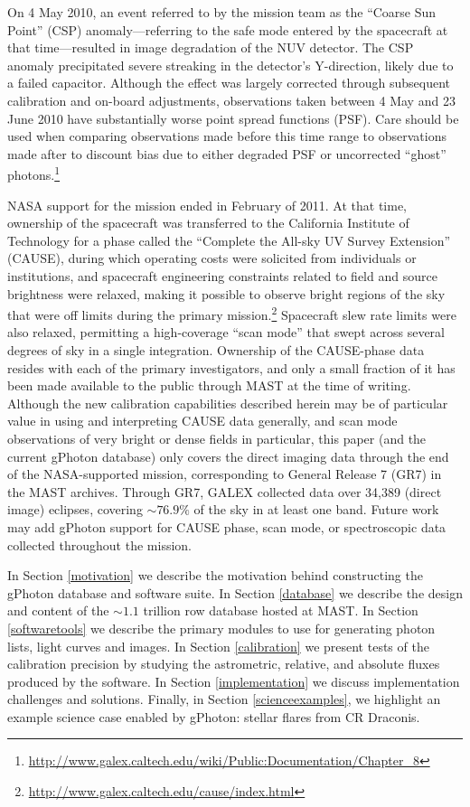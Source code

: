 \documentclass[preprint]{aastex}
\begin{document}
On 4 May 2010, an event referred to by the mission team as the ``Coarse Sun Point'' (CSP) anomaly---referring to the safe mode entered by the spacecraft at that time---resulted in image degradation of the NUV detector. The CSP anomaly precipitated severe streaking in the detector's Y-direction, likely due to a failed capacitor. Although the effect was largely corrected through subsequent calibration and on-board adjustments, observations taken between 4 May and 23 June 2010 have substantially worse point spread functions (PSF). Care should be used when comparing observations made before this time range to observations made after to discount bias due to either degraded PSF or uncorrected ``ghost'' photons.\footnote{\url{http://www.galex.caltech.edu/wiki/Public:Documentation/Chapter_8}}

NASA support for the mission ended in February of 2011. At that time, ownership of the spacecraft was transferred to the California Institute of Technology for a phase called the ``Complete the All-sky UV Survey Extension'' (CAUSE), during which operating costs were solicited from individuals or institutions, and spacecraft engineering constraints related to field and source brightness were relaxed, making it possible to observe bright regions of the sky that were off limits during the primary mission.\footnote{\url{http://www.galex.caltech.edu/cause/index.html}} Spacecraft slew rate limits were also relaxed, permitting a high-coverage ``scan mode'' that swept across several degrees of sky in a single integration. Ownership of the CAUSE-phase data resides with each of the primary investigators, and only a small fraction of it has been made available to the public through MAST at the time of writing. Although the new calibration capabilities described herein may be of particular value in using and interpreting CAUSE data generally, and scan mode observations of very bright or dense fields in particular, this paper (and the current gPhoton database) only covers the direct imaging data through the end of the NASA-supported mission, corresponding to General Release 7 (GR7) in the MAST archives. Through GR7, GALEX collected data over 34,389 (direct image) eclipses, covering $\sim76.9\%$ of the sky in at least one band. Future work may add gPhoton support for CAUSE phase, scan mode, or spectroscopic data collected throughout the mission.

In Section \ref{motivation} we describe the motivation behind constructing the gPhoton database and software suite. In Section \ref{database} we describe the design and content of the $\sim 1.1$ trillion row database hosted at MAST. In Section \ref{softwaretools} we describe the primary modules to use for generating photon lists, light curves and images. In Section \ref{calibration} we present tests of the calibration precision by studying the astrometric, relative, and absolute fluxes produced by the software. In Section \ref{implementation} we discuss implementation challenges and solutions. Finally, in Section \ref{scienceexamples}, we highlight an example science case enabled by gPhoton: stellar flares from CR Draconis.
\end{document}
